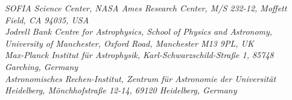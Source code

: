 {    {\sofia}{\it{SOFIA Science Center, NASA Ames Research Center, M/S 232-12, Moffett Field, CA 94035, USA}}\\
    {\jodrell}{\it{Jodrell Bank Centre for Astrophysics, School of Physics and Astronomy, University of Manchester, Oxford Road, Manchester M13 9PL, UK}} \\
    {\mpia}{\it{Max-Planck Institut f{\"u}r Astrophysik, Karl-Schwarzschild-Stra{\ss}e 1, 85748 Garching, Germany}} \\
    {\iah}{\it{Astronomisches Rechen-Institut, Zentrum f{\"u}r Astronomie der Universit{\"a}t Heidelberg, M{\"o}nchhofstra{\ss}e 12-14, 69120 Heidelberg, Germany}}
    }


